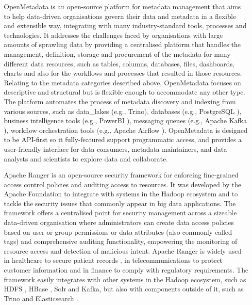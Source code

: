 OpenMetadata is an open-source platform for metadata management that aims to help data-driven organisations govern their data and metadata in a flexible and extensible way, integrating with many industry-standard tools, processes and technologies. It addresses the challenges faced by organisations with large amounts of sprawling data by providing a centralised platform that handles the management, definition, storage and procurement of the metadata for many different data resources, such as tables, columns, databases, files, dashboards, charts and also for the workflows and processes that resulted in those resources. Relating to the metadata categories described above, OpenMetadata focuses on descriptive and structural but is flexible enough to accommodate any other type. The platform automates the process of metadata discovery and indexing from various sources, such as \glspl{data_lake} (e.g., Trino), databases (e.g., PostgreSQL \cite{postgresqlTech}), business intelligence tools (e.g., PowerBI \cite{powerbiTech}), messaging queues (e.g., Apache Kafka \cite{apacheKafkaTech}), workflow orchestration tools (e.g., Apache Airflow \cite{apacheAirflowTech}). OpenMetadata is designed to be API-first \cite{apiFirstBealieu} so it fully-featured support programmatic access, and provides a user-friendly interface for data consumers, metadata maintainers, and data analysts and scientists to explore data and collaborate.

Apache Ranger \cite{apacheRangerAccessControlModelGuptaMaanak2017,apacheRangerMultiLayerdGuptaMaanak2017} is an open-source security framework for enforcing fine-grained access control policies and auditing access to resources. It was developed by the Apache Foundation to integrate with systems in the Hadoop ecosystem and to tackle the security issues that commonly appear in big data applications. The framework offers a centralised point for security management across a sizeable data-driven organisation where administrators can create data access policies based on user or group permissions or data attributes (also commonly called tags) and comprehensive auditing functionality, empowering the monitoring of resource access and detection of malicious intent. Apache Ranger is widely used in healthcare 
to secure patient records \cite{rangerHealhcareRangarajan2018}, in telecommunications to protect customer information \cite{rangerTelecomAhmad2019} and in finance to comply with regulatory requirements. The framework easily integrates with other systems in the Hadoop ecosystem, such as HDFS \cite{HDFSBorthakur2008}, HBase \cite{apacheHbaseTech}, Solr \cite{apacheSolrTech} and Kafka, but also with components outside of it, such as Trino and Elasticsearch \cite{elasticsearchTech}.


